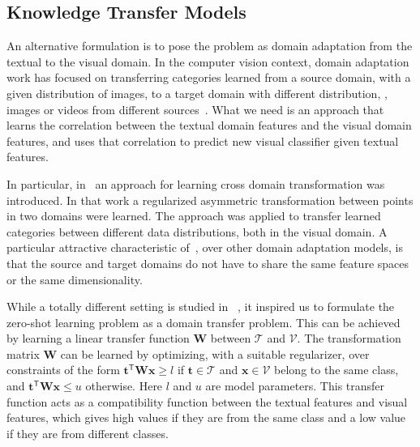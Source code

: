 \subsection{Knowledge Transfer Models}
An alternative formulation is to pose the problem as domain adaptation from the textual to the visual domain. In the computer vision context, domain adaptation work has focused on transferring categories learned from a source domain,  with a given distribution of images, to a target domain with different distribution, \eg, images or videos from different sources~\cite{yang07,saenko10,da11,duan12}. 
What we need is an approach that learns the correlation between the textual domain features and the visual domain features, and uses that correlation to predict new visual classifier given textual features. 

In particular, in~\cite{da11} an approach for learning cross domain transformation was introduced. In that work a regularized asymmetric transformation between points in two domains were learned. The approach was applied to transfer learned categories between different data distributions, both in the visual domain. A particular attractive characteristic of~\cite{da11}, over other domain adaptation models, is that the source and target domains do not have to share the same feature spaces or the same dimensionality. 

While a totally different setting is studied in ~\cite{da11}, it inspired us to formulate the zero-shot learning problem as a domain transfer problem. This can be achieved by learning a linear transfer function $\mathbf{W}$ between $\mathcal{T}$ and $\mathcal{V}$.  The transformation matrix $\mathbf{W}$ can be learned  by optimizing, with a suitable regularizer, over constraints of the form $\mathbf{t}^\textsf{T}\mathbf{W}\mathbf{x} \geq l $ if $\mathbf{t} \in \mathcal{T}$  and $\mathbf{x}\in \mathcal{V}$  belong to the same class, and $\mathbf{t}^\textsf{T}\mathbf{W}\mathbf{x} \leq u $  otherwise. Here $l$ and $u$ are model parameters. This transfer function acts as a compatibility function between the textual features and visual features, which gives high values if they are from the same class and a low value if they are from different classes. 


